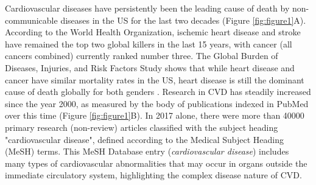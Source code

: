 \documentclass[letter]{bioinfo}
\begin{document}
Cardiovascular diseases have persistently been the leading cause of death by non-communicable diseases in the US for the last two decades (Figure \ref{fig:figure1}A).  According to the World Health Organization, ischemic heart disease and stroke have remained the top two global killers in the last 15 years, with cancer (all cancers combined) currently ranked number three.  The Global Burden of Diseases, Injuries, and Risk Factors Study shows that while heart disease and cancer have similar mortality rates in the US, heart disease is still the dominant cause of death globally for both genders \citep{Roth:2018:Global}.  Research in CVD has steadily increased since the year 2000, as measured by the body of publications indexed in PubMed over this time (Figure \ref{fig:figure1}B).  In 2017 alone, there were more than 40000 primary research (non-review) articles classified with the subject heading "cardiovascular disease", defined according to the Medical Subject Heading (MeSH) terms.  This MeSH Database entry (\textit{cardiovascular disease}) includes many types of cardiovascular abnormalities that may occur in organs outside the immediate circulatory system, highlighting the complex disease nature of CVD.
\end{document}
